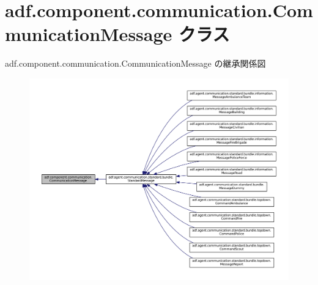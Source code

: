 \hypertarget{classadf_1_1component_1_1communication_1_1CommunicationMessage}{}\section{adf.\+component.\+communication.\+Communication\+Message クラス}
\label{classadf_1_1component_1_1communication_1_1CommunicationMessage}


adf.\+component.\+communication.\+Communication\+Message の継承関係図
\nopagebreak
\begin{figure}[H]
\begin{center}
\leavevmode
\includegraphics[width=350pt]{classadf_1_1component_1_1communication_1_1CommunicationMessage__inherit__graph}
\end{center}
\end{figure}
